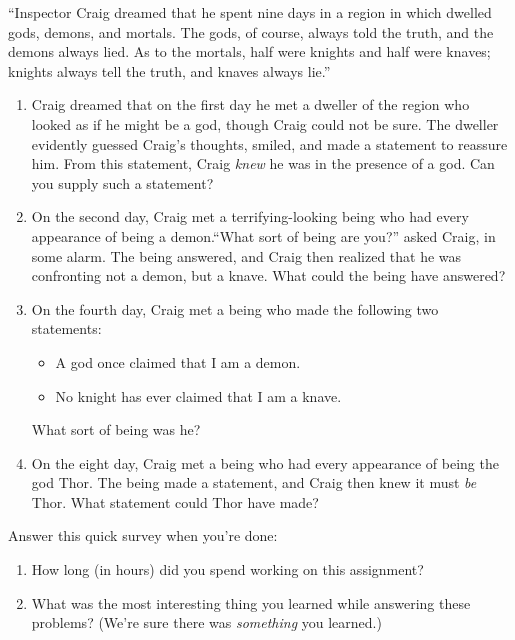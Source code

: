 \documentclass[12pt,letterpaper,boxed,cm]{hmcpset}
\begin{document}
\begin{problem}[6.]
    [8 points] ``Inspector Craig dreamed that he spent nine days in a region in which dwelled gods, demons, and mortals. The gods, of course, always told the truth, and the demons always lied. As to the mortals, half were knights and half were knaves; knights always tell the truth, and knaves always lie.''
    \begin{enumerate}[label=\Alph*.]
        \item Craig dreamed that on the first day he met a dweller of the region who looked as if he might be a god, though Craig could not be sure. The dweller evidently guessed Craig's thoughts, smiled, and made a statement to reassure him. From this statement, Craig \emph{knew} he was in the presence of a god. Can you supply such a statement?
        \item On the second day, Craig met a terrifying-looking being who had every appearance of being a demon.``What sort of being are you?'' asked Craig, in some alarm. The being answered, and Craig then realized that he was confronting not a demon, but a knave. What could the being have answered?
        \item On the fourth day, Craig met a being who made the following two statements:
        \begin{itemize}
            \item A god once claimed that I am a demon.
            \item No knight has ever claimed that I am a knave.
        \end{itemize}
        What sort of being was he?
        \item On the eight day, Craig met a being who had every appearance of being the god Thor. The being made a statement, and Craig then knew it must \emph{be} Thor. What statement could Thor have made?
    \end{enumerate}
\end{problem}

\begin{solution}
    \vfill
\end{solution}
\newpage

\begin{problem} Answer this quick survey when you’re done:
    \begin{enumerate}[label=\Alph*.]
        \item How long (in hours) did you spend working on this assignment?
        \item What was the most interesting thing you learned while answering these problems? (We're sure there was \emph{something} you learned.)
    \end{enumerate}
    
\end{problem}

\begin{solution}
    \vfill
\end{solution}
\end{document}
